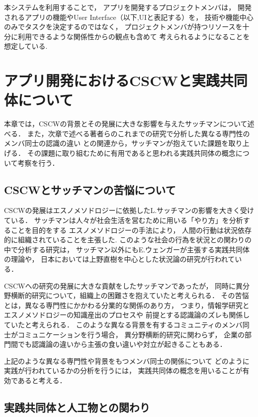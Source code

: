 \documentclass[twoside]{wiss}
\begin{document}
本システムを利用することで，
アプリを開発するプロジェクトメンバは，
開発されるアプリの機能やUser Interface（以下,UIと表記する）を，
技術や機能中心のみでタスクを決定するのではなく，
プロジェクトメンバが持つリソースを十分に利用できるような関係性からの観点も含めて
考えられるようになることを想定している.

\section{アプリ開発におけるCSCWと実践共同体について}
\label{previous-research-cscw}

本章では，CSCWの背景とその発展に大きな影響を与えたサッチマンについて述べる．
また，次章で述べる著者らのこれまでの研究で分析した異なる専門性のメンバ同士の認識の違い
との関連から，サッチマンが抱えていた課題を取り上げる．
その課題に取り組むために有用であると思われる実践共同体の概念について考察を行う．


\subsection{CSCWとサッチマンの苦悩について}
CSCWの発展はエスノメソドロジーに依拠したL.サッチマンの影響を大きく受けている．
サッチマンは人々が社会生活を営むために用いる「やり方」を分析することを目的をする
エスノメソドロジー\cite{ethnomethodology}の手法により，
人間の行動は状況依存的に組織されていることを主張した\cite{suchman}.
このような社会の行為を状況との関わりの中で分析する研究は，
サッチマン以外にもE.ウェンガーが主張する実践共同体\cite{wenger}の理論や，
日本においては上野直樹を中心とした状況論の研究が行われている\cite{ueno}．

CSCWへの研究の発展に大きな貢献をしたサッチマンであったが，
同時に異分野横断的研究について，組織上の困難さを抱えていたと考えられる\cite{SuchmanDistress}．
その苦悩とは，異なる専門性にかかわる分業的な関係のあり方，
つまり，情報学研究とエスノメソドロジーの知識産出のプロセスや
前提とする認識論のズレも関係していたと考えられる\cite{gap}．
このような異なる背景を有するコミュニティのメンバ同士がコミュニケーションを行う場合，
異分野横断的研究に関わらず，
企業の部門間でも認識論の違いから主張の食い違いや対立が起きることもある\cite{conflict}．

上記のような異なる専門性や背景をもつメンバ同士の関係について
どのように実践が行われているかの分析を行うには，
実践共同体の概念を用いることが有効であると考える．

\subsection{実践共同体と人工物との関わり}
\end{document}
